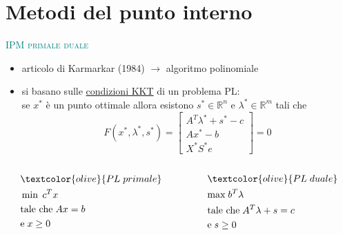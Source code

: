 
\section{Metodi del punto interno}

\begin{frame}[t]{\textcolor{teal}{\textsc{\LARGE IPM primale duale}}}

\pause
	\begin{itemize}
		\item articolo di Karmarkar (1984) %
		$\rightarrow$ algoritmo polinomiale
		\pause
		\item si basano sulle \underline{condizioni KKT} di un problema PL:
		\pause\\[0.5 cm] se $x^{*}$ è un punto ottimale allora esistono $s^{*}\in\mathbb{R}^{n}$ e $\lambda^{*}\in\mathbb{R}^{m}$ tali che
		\begin{equation*}
		\mathit{F}(x^{*},\lambda^{*},s^{*})= \begin{bmatrix}
		A^{T}\lambda^{*}+s^{*}-c \\Ax^{*}-b \\X^{*}S^{*}e
		\end{bmatrix}=0
		\end{equation*}
		\end{itemize}
		\pause
	\begin{columns}
		\begin{column}{0.4\textwidth}
			\begin{equation*}
			\begin{split}
			&\textcolor{olive}{PL\; primale}\\
			&\min\;c^{T}x\\
			&\text{tale che\;}Ax= b\;\\&\text{e\;}x\geq0
			\end{split}
			\end{equation*}	
		\end{column}
		\begin{column}{0.4\textwidth}
			\begin{equation*}
			\begin{split}
			&\textcolor{olive}{PL\; duale}\\
			&\text{max\;}b^{T}\lambda\\
			&\text{tale che\;}A^{T}\lambda+s=c\\ &\text{e\;} s\geq0
			\end{split}
			\end{equation*}	
		\end{column}		
	\end{columns}
\end{frame}

